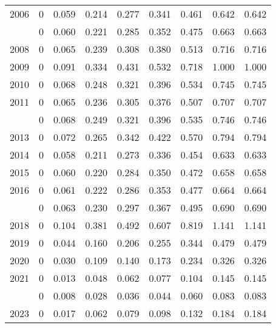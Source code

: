 \documentclass[
]{article}
\begin{document}
\begin{longtable}[t]{lrrrrrrrr}
2006 & 0 & 0.059 & 0.214 & 0.277 & 0.341 & 0.461 & 0.642 & 0.642\\
\addlinespace
2007 & 0 & 0.060 & 0.221 & 0.285 & 0.352 & 0.475 & 0.663 & 0.663\\
2008 & 0 & 0.065 & 0.239 & 0.308 & 0.380 & 0.513 & 0.716 & 0.716\\
2009 & 0 & 0.091 & 0.334 & 0.431 & 0.532 & 0.718 & 1.000 & 1.000\\
2010 & 0 & 0.068 & 0.248 & 0.321 & 0.396 & 0.534 & 0.745 & 0.745\\
2011 & 0 & 0.065 & 0.236 & 0.305 & 0.376 & 0.507 & 0.707 & 0.707\\
\addlinespace
2012 & 0 & 0.068 & 0.249 & 0.321 & 0.396 & 0.535 & 0.746 & 0.746\\
2013 & 0 & 0.072 & 0.265 & 0.342 & 0.422 & 0.570 & 0.794 & 0.794\\
2014 & 0 & 0.058 & 0.211 & 0.273 & 0.336 & 0.454 & 0.633 & 0.633\\
2015 & 0 & 0.060 & 0.220 & 0.284 & 0.350 & 0.472 & 0.658 & 0.658\\
2016 & 0 & 0.061 & 0.222 & 0.286 & 0.353 & 0.477 & 0.664 & 0.664\\
\addlinespace
2017 & 0 & 0.063 & 0.230 & 0.297 & 0.367 & 0.495 & 0.690 & 0.690\\
2018 & 0 & 0.104 & 0.381 & 0.492 & 0.607 & 0.819 & 1.141 & 1.141\\
2019 & 0 & 0.044 & 0.160 & 0.206 & 0.255 & 0.344 & 0.479 & 0.479\\
2020 & 0 & 0.030 & 0.109 & 0.140 & 0.173 & 0.234 & 0.326 & 0.326\\
2021 & 0 & 0.013 & 0.048 & 0.062 & 0.077 & 0.104 & 0.145 & 0.145\\
\addlinespace
2022 & 0 & 0.008 & 0.028 & 0.036 & 0.044 & 0.060 & 0.083 & 0.083\\
2023 & 0 & 0.017 & 0.062 & 0.079 & 0.098 & 0.132 & 0.184 & 0.184\\*
\end{longtable}
\end{document}

